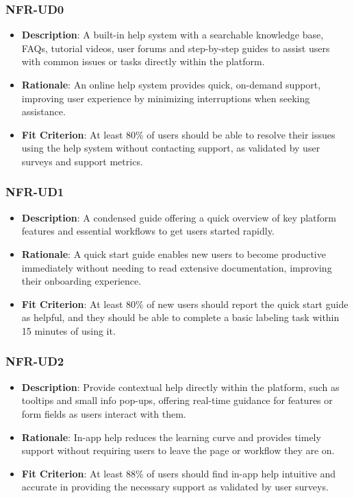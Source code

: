\documentclass[12pt]{article}
\begin{document}
        \subsubsection*{NFR-UD0} 
        \begin{itemize} 
            \item \textbf{Description}: A built-in help system with a searchable knowledge base, FAQs, tutorial videos, user forums and step-by-step guides to assist users with common issues or tasks directly within the platform.  
            \item \textbf{Rationale}: An online help system provides quick, on-demand support, improving user experience by minimizing interruptions when seeking assistance.  
            \item \textbf{Fit Criterion}: At least 80\% of users should be able to resolve their issues using the help system without contacting support, as validated by user surveys and support metrics.
        \end{itemize}
        \subsubsection*{NFR-UD1}   
        \begin{itemize} 
            \item \textbf{Description}: A condensed guide offering a quick overview of key platform features and essential workflows to get users started rapidly.  
            \item \textbf{Rationale}: A quick start guide enables new users to become productive immediately without needing to read extensive documentation, improving their onboarding experience.  
            \item \textbf{Fit Criterion}: At least 80\% of new users should report the quick start guide as helpful, and they should be able to complete a basic labeling task within 15 minutes of using it.
        \end{itemize}
        \subsubsection*{NFR-UD2} 
        \begin{itemize} 
            \item \textbf{Description}: Provide contextual help directly within the platform, such as tooltips and small info pop-ups, offering real-time guidance for features or form fields as users interact with them.  
            \item \textbf{Rationale}: In-app help reduces the learning curve and provides timely support without requiring users to leave the page or workflow they are on.  
            \item \textbf{Fit Criterion}: At least 88\% of users should find in-app help intuitive and accurate in providing the necessary support as validated by user surveys.
        \end{itemize}
\end{document}

